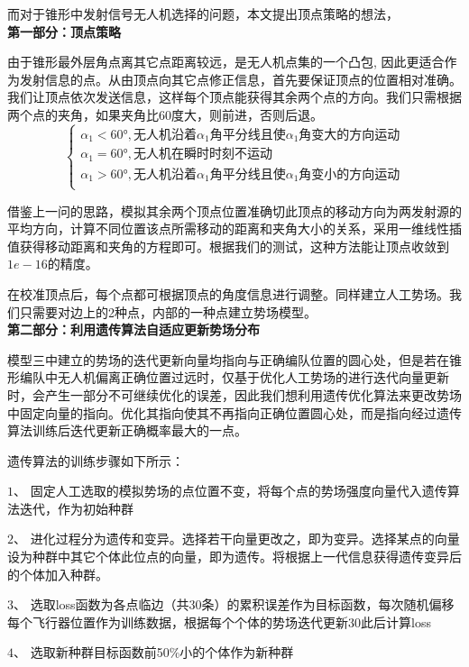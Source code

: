 \documentclass{my_paper}
\begin{document}
而对于锥形中发射信号无人机选择的问题，本文提出顶点策略的想法，\\

\textbf{第一部分：顶点策略}

由于锥形最外层角点离其它点距离较远，是无人机点集的一个凸包, 因此更适合作为发射信息的点。从由顶点向其它点修正信息，首先要保证顶点的位置相对准确。我们让顶点依次发送信息，这样每个顶点能获得其余两个点的方向。我们只需根据两个点的夹角，如果夹角比60度大，则前进，否则后退。
$$
\begin{cases}
        \alpha_1<60° , \textbf{无人机沿着}\alpha_1\textbf{角平分线且使}\alpha_1\textbf{角变大的方向运动}\\
        \alpha_1=60° , \textbf{无人机在瞬时时刻不运动}  \\                           
        \alpha_1>60° , \textbf{无人机沿着}\alpha_1\textbf{角平分线且使}\alpha_1\textbf{角变小的方向运动}\\
    \end{cases}
$$

借鉴上一问的思路，模拟其余两个顶点位置准确切此顶点的移动方向为两发射源的平均方向，计算不同位置该点所需移动的距离和夹角大小的关系，采用一维线性插值获得移动距离和夹角的方程即可。根据我们的测试，这种方法能让顶点收敛到$1e-16$的精度。

在校准顶点后，每个点都可根据顶点的角度信息进行调整。同样建立人工势场。我们只需要对边上的2种点，内部的一种点建立势场模型。\\

\textbf{第二部分：利用遗传算法自适应更新势场分布}

模型三中建立的势场的迭代更新向量均指向与正确编队位置的圆心处，但是若在锥形编队中无人机偏离正确位置过远时，仅基于优化人工势场的进行迭代向量更新时，会产生一部分不可继续优化的误差，因此我们想利用遗传优化算法来更改势场中固定向量的指向。优化其指向使其不再指向正确位置圆心处，而是指向经过遗传算法训练后迭代更新正确概率最大的一点。

遗传算法的训练步骤如下所示：

$1、$   固定人工选取的模拟势场的点位置不变，将每个点的势场强度向量代入遗传算法迭代，作为初始种群

$2、$   进化过程分为遗传和变异。选择若干向量更改之，即为变异。选择某点的向量设为种群中其它个体此位点的向量，即为遗传。将根据上一代信息获得遗传变异后的个体加入种群。

$3、$ 选取loss函数为各点临边（共30条）的累积误差作为目标函数，每次随机偏移每个飞行器位置作为训练数据，根据每个个体的势场迭代更新30此后计算loss

$4、$ 选取新种群目标函数前50\%小的个体作为新种群
\end{document}
